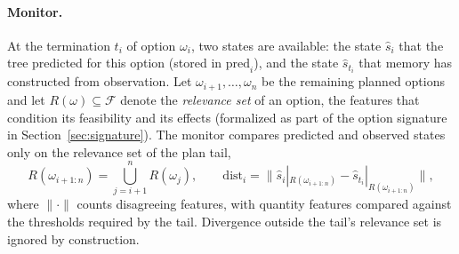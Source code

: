 \documentclass[11pt]{article}
\newcommand{\calF}{\mathcal{F}}
\newcommand{\Rel}{R}
\newcommand{\shat}{\hat{s}}
\newcommand{\dist}{\mathrm{dist}}
\begin{document}
\paragraph{Monitor.}
At the termination $t_i$ of option $\omega_i$, two states are available: the state $\shat_i$ that the tree predicted for this option (stored in $\mathrm{pred}_i$), and the state $\shat_{t_i}$ that memory has constructed from observation. Let $\omega_{i+1},\dots,\omega_n$ be the remaining planned options and let $\Rel(\omega)\subseteq\calF$ denote the \emph{relevance set} of an option, the features that condition its feasibility and its effects (formalized as part of the option signature in Section~\ref{sec:signature}). The monitor compares predicted and observed states only on the relevance set of the plan tail,
\begin{equation}
\Rel(\omega_{i+1:n})=\textstyle\bigcup_{j=i+1}^{n}\Rel(\omega_j),\qquad
\dist_i=\big\|\shat_i|_{\Rel(\omega_{i+1:n})}-\shat_{t_i}|_{\Rel(\omega_{i+1:n})}\big\|,
\label{eq:monitor}
\end{equation}
where $\|\cdot\|$ counts disagreeing features, with quantity features compared against the thresholds required by the tail. Divergence outside the tail's relevance set is ignored by construction.
\end{document}
